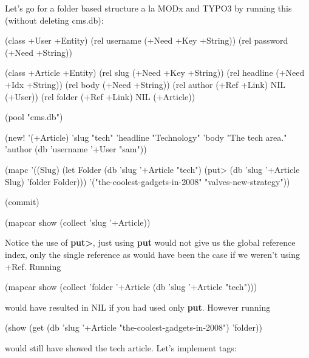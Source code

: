 Let's go for a folder based structure a la MODx and TYPO3 by running
this (without deleting cms.db):


\begin{wideverbatim}
(class +User +Entity)
(rel username (+Need +Key +String))
(rel password (+Need +String))

(class +Article +Entity)
(rel slug     (+Need +Key +String))
(rel headline (+Need +Idx +String))
(rel body     (+Need +String))
(rel author   (+Ref +Link) NIL (+User))
(rel folder   (+Ref +Link) NIL (+Article))

(pool "cms.db")

(new! '(+Article) 'slug "tech" 'headline "Technology" 'body "The tech area." 'author (db 'username '+User "sam"))

(mapc '((Slug)
         (let Folder (db 'slug '+Article "tech")
           (put> (db 'slug '+Article Slug) 'folder Folder)))
       '("the-coolest-gadgets-in-2008" "valves-new-strategy"))

(commit)

(mapcar show (collect 'slug '+Article))
\end{wideverbatim}

Notice the use of \textbf{put>}, just using \textbf{put} would not give us the global
reference index, only the single reference as would have been the case
if we weren't using +Ref. Running


\begin{wideverbatim}
(mapcar show (collect 'folder '+Article (db 'slug '+Article "tech")))
\end{wideverbatim}

would have resulted in NIL if you had used only \textbf{put}. However running


\begin{wideverbatim}
(show (get (db 'slug '+Article "the-coolest-gadgets-in-2008") 'folder))
\end{wideverbatim}

would still have showed the tech article. Let's implement tags:


